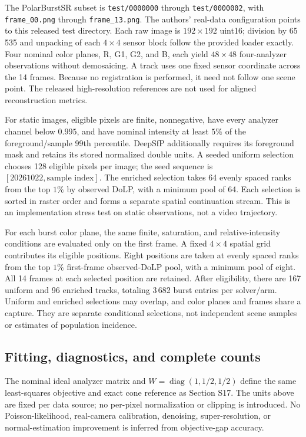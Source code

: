 \documentclass[10pt,a4paper]{article}
\begin{document}
The PolarBurstSR subset is \nolinkurl{test/0000000} through \nolinkurl{test/0000002}, with \nolinkurl{frame_00.png} through \nolinkurl{frame_13.png}. The authors' real-data configuration points to this released test directory. Each raw image is $192\times192$ uint16; division by 65\,535 and unpacking of each $4\times4$ sensor block follow the provided loader exactly. Four nominal color planes, R, G1, G2, and B, each yield $48\times48$ four-analyzer observations without demosaicing. A track uses one fixed sensor coordinate across the 14 frames. Because no registration is performed, it need not follow one scene point. The released high-resolution references are not used for aligned reconstruction metrics.

For static images, eligible pixels are finite, nonnegative, have every analyzer channel below $0.995$, and have nominal intensity at least $5\%$ of the foreground/sample 99th percentile. DeepSfP additionally requires its foreground mask and retains its stored normalized double units. A seeded uniform selection chooses 128 eligible pixels per image; the seed sequence is $[20261022,\text{sample index}]$. The enriched selection takes 64 evenly spaced ranks from the top $1\%$ by observed DoLP, with a minimum pool of 64. Each selection is sorted in raster order and forms a separate spatial continuation stream. This is an implementation stress test on static observations, not a video trajectory.

For each burst color plane, the same finite, saturation, and relative-intensity conditions are evaluated only on the first frame. A fixed $4\times4$ spatial grid contributes its eligible positions. Eight positions are taken at evenly spaced ranks from the top $1\%$ first-frame observed-DoLP pool, with a minimum pool of eight. All 14 frames at each selected position are retained. After eligibility, there are 167 uniform and 96 enriched tracks, totaling 3\,682 burst entries per solver/arm. Uniform and enriched selections may overlap, and color planes and frames share a capture. They are separate conditional selections, not independent scene samples or estimates of population incidence.

\subsection{Fitting, diagnostics, and complete counts}
The nominal ideal analyzer matrix and $W=\operatorname{diag}(1,1/2,1/2)$ define the same least-squares objective and exact cone reference as Section S17. The units above are fixed per data source; no per-pixel normalization or clipping is introduced. No Poisson-likelihood, real-camera calibration, denoising, super-resolution, or normal-estimation improvement is inferred from objective-gap accuracy.
\end{document}
